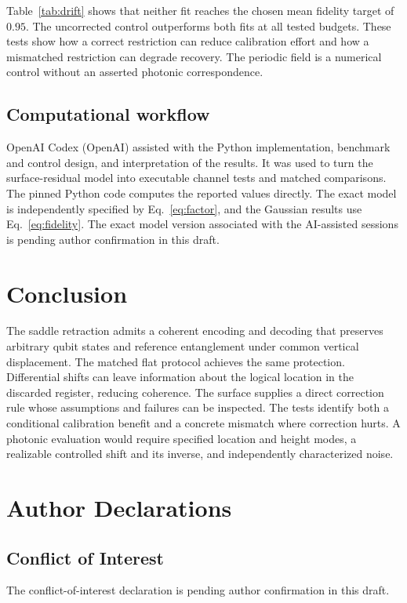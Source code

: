 \documentclass[aip,adv,reprint,floatfix]{revtex4-2}
\begin{document}
Table~\ref{tab:drift} shows that neither fit reaches the chosen mean fidelity target of \(0.95\). The uncorrected control outperforms both fits at all tested budgets. These tests show how a correct restriction can reduce calibration effort and how a mismatched restriction can degrade recovery. The periodic field is a numerical control without an asserted photonic correspondence.

\subsection{Computational workflow}

OpenAI Codex (OpenAI) assisted with the Python implementation, benchmark and control design, and interpretation of the results. It was used to turn the surface-residual model into executable channel tests and matched comparisons. The pinned Python code computes the reported values directly. The exact model is independently specified by Eq.~\eqref{eq:factor}, and the Gaussian results use Eq.~\eqref{eq:fidelity}. The exact model version associated with the AI-assisted sessions is pending author confirmation in this draft.

\section{Conclusion}

The saddle retraction admits a coherent encoding and decoding that preserves arbitrary qubit states and reference entanglement under common vertical displacement. The matched flat protocol achieves the same protection. Differential shifts can leave information about the logical location in the discarded register, reducing coherence. The surface supplies a direct correction rule whose assumptions and failures can be inspected. The tests identify both a conditional calibration benefit and a concrete mismatch where correction hurts. A photonic evaluation would require specified location and height modes, a realizable controlled shift and its inverse, and independently characterized noise.

\section*{Author Declarations}
\subsection*{Conflict of Interest}
The conflict-of-interest declaration is pending author confirmation in this draft.
\end{document}
